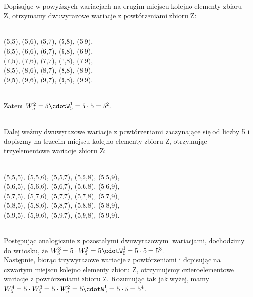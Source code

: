 \documentclass[polish,10pt]{article}
\begin{document}
\hspace{1cm}\\Dopisując w powyższych wariacjach na drugim miejscu kolejno elementy zbioru Z, otrzymamy dwuwyrazowe wariacje z powtórzeniami zbioru Z:

\hspace{1cm}\\(5,5), (5,6), (5,7), (5,8), (5,9),
\\(6,5), (6,6), (6,7), (6,8), (6,9),
\\(7,5), (7,6), (7,7), (7,8), (7,9),
\\(8,5), (8,6), (8,7), (8,8), (8,9),
\\(9,5), (9,6), (9,7), (9,8), (9,9).

\hspace{1cm}\\Zatem $W^2_5=5\cdotW^1_5=5\cdot5=5^2$.

\hspace{1cm}\\Dalej weźmy dwuwyrazowe wariacje z powtórzeniami zaczynające się od liczby 5 i dopiszmy na trzecim miejscu kolejno elementy zbioru Z, otrzymując trzyelementowe wariacje zbioru Z:

\hspace{1cm}\\(5,5,5), (5,5,6), (5,5,7), (5,5,8), (5,5,9),
\\(5,6,5), (5,6,6), (5,6,7), (5,6,8), (5,6,9),
\\(5,7,5), (5,7,6), (5,7,7), (5,7,8), (5,7,9),
\\(5,8,5), (5,8,6), (5,8,7), (5,8,8), (5,8,9),
\\(5,9,5), (5,9,6), (5,9,7), (5,9,8), (5,9,9).


\hspace{1cm}\\Postępując analogicznie z pozostałymi dwuwyrazowymi wariacjami, dochodzimy do wniosku, że  $W^3_5 = 5\cdot W^2_5 = 5\cdotW^1_5 = 5\cdot5=5^3$.
\hspace{1cm}\\Następnie, biorąc trzywyrazowe wariacje z powtórzeniami i dopisując na czwartym miejscu kolejno elementy zbioru Z, otrzymujemy czteroelementowe wariacje z powtórzeniami zbioru Z.
Rozumując tak jak wyżej, mamy $W^4_5 = 5\cdot W^3_5 = 5\cdot W^2_5 = 5\cdotW^1_5 = 5\cdot5=5^4$.



\hspace{1cm}\\\noindent{}
\end{document}
